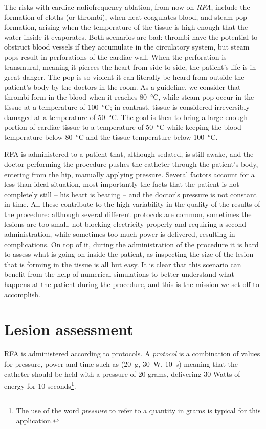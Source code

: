 The risks with cardiac radiofrequency ablation, from now on \emph{RFA}, include the formation of cloths (or thrombi), when heat coagulates blood, and steam pop formation, arising when the temperature of the tissue is high enough that the water inside it evaporates.
Both scenarios are bad: thrombi have the potential to obstruct blood vessels if they accumulate in the circulatory system, but steam pops result in perforations of the cardiac wall.
When the perforation is transmural, meaning it pierces the heart from side to side, the patient's life is in great danger.
The pop is so violent it can literally be heard from outside the patient's body by the doctors in the room.
As a guideline, we consider that thrombi form in the blood when it reaches \SI{80}{\celsius}, while steam pop occur in the tissue at a temperature of \SI{100}{\celsius}; in contrast, tissue is considered irreversibly damaged at a temperature of \SI{50}{\celsius}.
The goal is then to bring a large enough portion of cardiac tissue to a temperature of \SI{50}{\celsius} while keeping the blood temperature below \SI{80}{\celsius} and the tissue temperature below \SI{100}{\celsius}.

RFA is administered to a patient that, although sedated, is still awake, and the doctor performing the procedure pushes the catheter through the patient's body, entering from the hip, manually applying pressure.
Several factors account for a less than ideal situation, most importantly the facts that the patient is not completely still -- his heart is beating -- and the doctor's pressure is not constant in time.
All these contribute to the high variability in the quality of the results of the procedure: although several different protocols are common, sometimes the lesions are too small, not blocking electricity properly and requiring a second administration, while sometimes too much power is delivered, resulting in complications.
On top of it, during the administration of the procedure it is hard to assess what is going on inside the patient, as inspecting the size of the lesion that is forming in the tissue is all but easy.
It is clear that this scenario can benefit from the help of numerical simulations to better understand what happens at the patient during the procedure, and this is the mission we set off to accomplish.

\section{Lesion assessment}
\label{sec_rfaLesion}
RFA is administered according to protocols.
A \emph{protocol} is a combination of values for pressure, power and time such as (\SI{20}{g}, \SI{30}{W}, \SI{10}{s}) meaning that the catheter should be held with a pressure of 20 grams, delivering 30 Watts of energy for 10 seconds\footnote{The use of the word \emph{pressure} to refer to a quantity in grams is typical for this application.}.

